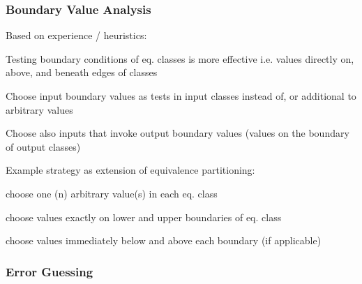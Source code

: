 
\subsubsection{Boundary Value Analysis}

Based on experience / heuristics:
\begin{itemize*}
\item Testing boundary conditions of eq. classes is more effective i.e. values directly on, above, and beneath edges of classes
\item Choose input boundary values as tests in input classes instead of, or additional to arbitrary values
\item Choose also inputs that invoke output boundary values (values on the boundary of output classes)
\item Example strategy as extension of equivalence partitioning:
\begin{itemize*}
	\item choose one (n) arbitrary value(s) in each eq. class
	\item choose values exactly on lower and upper boundaries of eq. class
	\item choose values immediately below and above each boundary (if applicable)
\end{itemize*}
\end{itemize*}


\subsubsection{Error Guessing}

